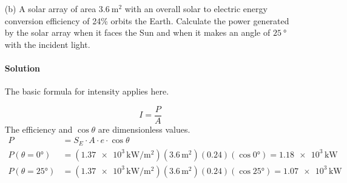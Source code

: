 \documentclass{article}
\begin{document}
{\begin{enumerate}
		\[
			S(r) = S_E \left( \frac{r_E}{r} \right)^2 ( 1 - A )
		\]
		Take $A=0$ for now.
		\begin{equation*}
			\begin{split}
				S(Geosynchronous) &= ( \SI{1.37}{\kilo\watt\per\meter\squared} ) \left( \frac{ (\num{1.5e11} \, \unit{\meter}) }{ (\num{1.5e11} \, \unit{\meter}) - (\num{3.6e7} \, \unit{\meter}) } \right)^2 \\
				&= \SI{1.37}{\kilo\watt\per\meter\squared} = S_E
			\end{split}
		\end{equation*}
		Clearly, the solar irradiance is practically the same for all altitudes. The only factor that would change that is the albedo of the solar array, with some online sources giving a range from 0.1 to 0.3
		\begin{equation*}
			\begin{split}
				S(A=0.1) &= ( \SI{1.37}{\kilo\watt\per\meter\squared} ) (1 - 0.1) = \num{1.23e3} \, \unit{\kilo\watt\per\meter\squared} \\
				S(A=0.3) &= ( \SI{1.37}{\kilo\watt\per\meter\squared} ) (1 - 0.3) = \num{9.59e2} \, \unit{\kilo\watt\per\meter\squared} \\
			\end{split}
		\end{equation*}

		\boldmath
		\item[(b)] A solar array of area $\SI{3.6}{\meter\squared}$ with an overall solar to electric energy conversion efficiency of 24\% orbits the Earth. Calculate the power generated by the solar array when it faces the Sun and when it makes an angle of $\SI{25}{\degree}$ with the incident light.
		\paragraph{Solution} The basic formula for intensity applies here. \unboldmath
		
		\[
			I = \frac{P}{A}
		\]
		The efficiency and $\cos \theta$ are dimensionless values.
		\begin{equation*}
			\begin{split}
				P &= S_E \cdot A \cdot e \cdot \cos \theta \\
				P(\theta = \ang{0}) &= ( \num{1.37e3} \, \unit{\kilo\watt\per\meter\squared} )  ( \num{3.6} \, \unit{\meter\squared} )  ( \num{0.24} ) ( \cos \ang{0}) = \num{1.18e3} \, \unit{\kilo\watt} \\
				P(\theta = \ang{25}) &= ( \num{1.37e3} \, \unit{\kilo\watt\per\meter\squared} )  ( \num{3.6} \, \unit{\meter\squared} )  ( \num{0.24} ) ( \cos \ang{25}) = \num{1.07e3} \, \unit{\kilo\watt}
			\end{split}
		\end{equation*}
		

\end{enumerate}}
\end{document}
